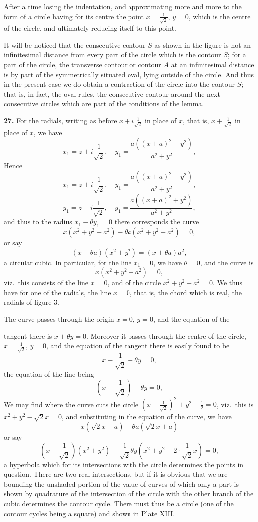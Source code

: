 \documentclass[11pt,a4paper]{book}
\begin{document}
After a time losing the indentation, and approximating more and more to the form of a circle having for its centre the point $x = \frac{1}{\sqrt{2}}$, $y = 0$, which is the centre of the circle, and ultimately reducing itself to this point.

It will be noticed that the consecutive contour $S$ as shown in the figure is not an infinitesimal distance from every part of the circle which is the contour $S$; for a part of the circle, the transverse contour or contour $A$ at an infinitesimal distance is by part of the symmetrically situated oval, lying outside of the circle. And thus in the present case we do obtain a contraction of the circle into the contour $S$; that is, in fact, the oval rules, the consecutive contour around the next consecutive circles which are part of the conditions of the lemma.

\textbf{27.} For the radials, writing as before $x + i \frac{1}{\sqrt{2}}$ in place of $x$, that is, $x + \frac{1}{\sqrt{2}}$ in place of $x$, we have
\[
x_1 = z + i \frac{1}{\sqrt{2}}, \quad y_1 = \frac{a((x + a)^2 + y^2)}{a^2 + y^2},
\]
Hence
\[
x_1 = z + i \frac{1}{\sqrt{2}}, \quad y_1 = \frac{a((x + a)^2 + y^2)}{a^2 + y^2},
\]
\[
y_1 = z + i \frac{1}{\sqrt{2}}, \quad y_1 = \frac{a((x + a)^2 + y^2)}{a^2 + y^2},
\]
and thus to the radius $x_1 - \theta y_1 = 0$ there corresponds the curve
\[
x(x^2 + y^2 - a^2) - \theta a(x^2 + y^2 + a^2) = 0,
\]
or say
\[
(x - \theta a)(x^2 + y^2) = (x + \theta a) a^2,
\]
a circular cubic. In particular, for the line $x_1 = 0$, we have $\theta = 0$, and the curve is
\[
x(x^2 + y^2 - a^2) = 0,
\]
viz.\ this consists of the line $x = 0$, and of the circle $x^2 + y^2 - a^2 = 0$. We thus have for one of the radials, the line $x = 0$, that is, the chord which is real, the radials of figure 3.

The curve passes through the origin $x = 0$, $y = 0$, and the equation of the

tangent there is $x + \theta y = 0$. Moreover it passes through the centre of the circle, $x = \frac{1}{\sqrt{2}}$, $y = 0$, and the equation of the tangent there is easily found to be
\[
x - \frac{1}{\sqrt{2}} - \theta y = 0,
\]
the equation of the line being
\[
\left(x - \frac{1}{\sqrt{2}}\right) - \theta y = 0,
\]
We may find where the curve cuts the circle $\left(x + \frac{1}{\sqrt{2}}\right)^2 + y^2 - \frac{1}{2} = 0$, viz.\ this is $x^2 + y^2 - \sqrt{2}x = 0$, and substituting in the equation of the curve, we have
\[
x(\sqrt{2}x - a) - \theta a(\sqrt{2}x + a)
\]
or say
\[
\left(x - \frac{1}{\sqrt{2}}\right)(x^2 + y^2) - \frac{1}{\sqrt{2}}\theta y(x^2 + y^2 - 2 \cdot \frac{1}{\sqrt{2}}x) = 0,
\]
a hyperbola which for its intersections with the circle determines the points in question. There are two real intersections, but if it is obvious that we are bounding the unshaded portion of the value of curves of which only a part is shown by quadrature of the intersection of the circle with the other branch of the cubic determines the contour cycle. There must thus be a circle (one of the contour cycles being a square) and shown in Plate XIII.
\end{document}
